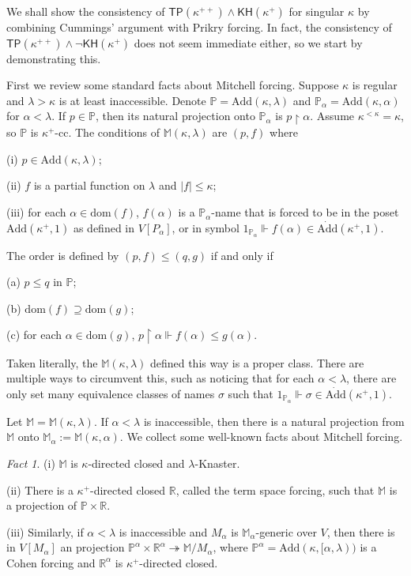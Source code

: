 \documentclass[10pt,reqno]{amsart}
\theoremstyle{plain}
\theoremstyle{definition}
\theoremstyle{remark}
\newtheorem{fact}[theorem]{Fact}
\begin{document}
We shall show the consistency of $\mathsf{TP(\kappa^{++})\land\mathsf{KH}(\kappa^+)}$ for singular $\kappa$ by combining Cummings' argument with Prikry forcing. In fact, the consistency of $\mathsf{TP(\kappa^{++})\land\lnot\mathsf{KH}(\kappa^+)}$ does not seem immediate either, so we start by demonstrating this.

First we review some standard facts about Mitchell forcing. Suppose $\kappa$ is regular and $\lambda>\kappa$ is at least inaccessible. Denote $\mathbb{P}=\mathrm{Add}(\kappa,\lambda)$ and $\mathbb{P}_\alpha=\mathrm{Add}(\kappa,\alpha)$ for $\alpha<\lambda$. If $p\in\mathbb{P}$, then its natural projection onto $\mathbb{P}_\alpha$ is $p\upharpoonright\alpha$. Assume $\kappa^{<\kappa}=\kappa$, so $\mathbb{P}$ is $\kappa^+$-cc. The conditions of $\mathbb{M}(\kappa,\lambda)$ are $(p,f)$ where 

(i) $p\in\mathrm{Add}(\kappa,\lambda)$;

(ii) $f$ is a partial function on $\lambda$ and $|f|\leq\kappa$;

(iii) for each $\alpha\in\mathrm{dom}(f)$, $f(\alpha)$ is a $\mathbb{P}_\alpha$-name that is forced to be in the poset $\mathrm{Add}(\kappa^+,1)$ as defined in $V[P_\alpha]$, or in symbol $1_{\mathbb{P}_\alpha}\Vdash f(\alpha)\in\dot{\mathrm{Add}}(\kappa^+,1)$.

The order is defined by $(p,f)\leq(q,g)$ if and only if 

(a) $p\leq q$ in $\mathbb{P}$;

(b) $\mathrm{dom}(f)\supseteq\mathrm{dom}(g)$;

(c) for each $\alpha\in\mathrm{dom}(g)$, $p\upharpoonright\alpha\Vdash f(\alpha)\leq g(\alpha)$.

Taken literally, the $\mathbb{M}(\kappa,\lambda)$ defined this way is a proper class. There are multiple ways to circumvent this, such as noticing that for each $\alpha<\lambda$, there are only set many equivalence classes of names $\sigma$ such that $1_{\mathbb{P}_\alpha}\Vdash \sigma\in\dot{\mathrm{Add}}(\kappa^+,1)$.

Let $\mathbb{M}=\mathbb{M}(\kappa,\lambda)$. If $\alpha<\lambda$ is inaccessible, then there is a natural projection from $\mathbb{M}$ onto $\mathbb{M}_\alpha:=\mathbb{M}(\kappa,\alpha)$. We collect some well-known facts about Mitchell forcing.

\begin{fact}
(i) $\mathbb{M}$ is $\kappa$-directed closed and $\lambda$-Knaster.

(ii) There is a $\kappa^+$-directed closed $\mathbb{R}$, called the term space forcing, such that $\mathbb{M}$ is a projection of $\mathbb{P}\times\mathbb{R}$.

(iii) Similarly, if $\alpha<\lambda$ is inaccessible and $M_\alpha$ is $\mathbb{M}_\alpha$-generic over $V$, then there is in $V[M_\alpha]$ an projection $\mathbb{P}^\alpha\times\mathbb{R}^\alpha\twoheadrightarrow\mathbb{M}/M_\alpha$, where $\mathbb{P}^\alpha=\mathrm{Add}(\kappa,[\alpha,\lambda))$ is a Cohen forcing and $\mathbb{R}^\alpha$ is $\kappa^+$-directed closed.
\end{fact}
\end{document}
